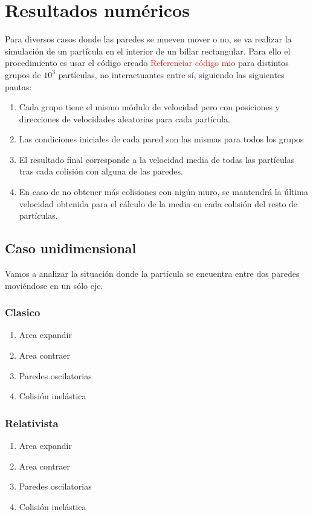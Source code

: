 \documentclass[11pt, spanish]{book}
\begin{document}
\chapter{Resultados numéricos}

Para diversos casos donde las paredes se mueven mover o no, se va realizar la simulación de un partícula en el interior de un billar rectangular. Para ello el procedimiento es usar el código creado \textcolor{red}{Referenciar código mio} para distintos grupos de \( 10^3 \) partículas, no interactuantes entre sí, siguiendo las siguientes pautas:

\begin{enumerate}
    \item Cada grupo tiene el mismo módulo de velocidad pero con posiciones y direcciones de velocidades aleatorias para cada partícula.
    \item Las condiciones iniciales de cada pared son las mismas para todos los grupos
    \item El resultado final corresponde a la velocidad media de todas las partículas tras cada colisión con alguna de las paredes.
    \item En caso de no obtener más colisiones con nigún muro, se mantendrá la última velocidad obtenida para el cálculo de la media en cada colisión del resto de partículas.
\end{enumerate}

\section{Caso unidimensional}

Vamos a analizar la situación donde la partícula se encuentra entre dos paredes moviéndose en un sólo eje.

\subsection{Clasico}
\begin{enumerate}
    \item Area expandir 
    \item Area contraer
    \item  Paredes oscilatorias
    \item Colisión inelástica
\end{enumerate}
\subsection{Relativista}
\begin{enumerate}
    \item Area expandir
    \item Area contraer
    \item  Paredes oscilatorias
    \item Colisión inelástica
\end{enumerate}
\end{document}
